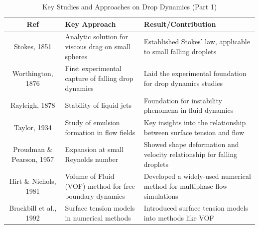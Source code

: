 \documentclass[12pt]{article}
\begin{document}
\begin{table}[htbp]
\scriptsize
\centering
\caption{Key Studies and Approaches on Drop Dynamics (Part 1)}
\renewcommand{\arraystretch}{1.2} %
\begin{tabularx}{\textwidth}{|c|X|X|}
\hline
\textbf{Ref} & \textbf{Key Approach} & \textbf{Result/Contribution} \\ \hline
Stokes, 1851 \cite{stokes1851pendulums} & Analytic solution for viscous drag on small spheres & Established Stokes' law, applicable to small falling droplets \\ \hline
Worthington, 1876 \cite{worthington1876study} & First experimental capture of falling drop dynamics & Laid the experimental foundation for drop dynamics studies \\ \hline
Rayleigh, 1878 \cite{rayleigh1878instability} & Stability of liquid jets & Foundation for instability phenomena in fluid dynamics \\ \hline
Taylor, 1934 \cite{taylor1934emulsions} & Study of emulsion formation in flow fields & Key insights into the relationship between surface tension and flow \\ \hline
Proudman \& Pearson, 1957 \cite{proudman1957expansion} & Expansion at small Reynolds number & Showed shape deformation and velocity relationship for falling droplets \\ \hline
Hirt \& Nichols, 1981 \cite{hirt1981volume} & Volume of Fluid (VOF) method for free boundary dynamics & Developed a widely-used numerical method for multiphase flow simulations \\ \hline
Brackbill et al., 1992 \cite{brackbill1992continuum} & Surface tension models in numerical methods & Introduced surface tension models into methods like VOF \\ \hline
\end{tabularx}
\end{table}
\end{document}

